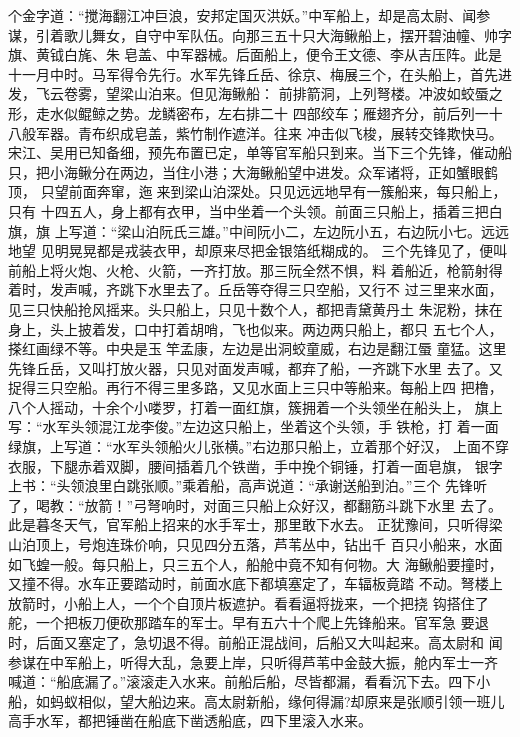 个金字道：“搅海翻江冲巨浪，安邦定国灭洪妖。”中军船上，却是高太尉、闻参
谋，引着歌儿舞女，自守中军队伍。向那三五十只大海鳅船上，摆开碧油幢、帅字
旗、黄钺白旄、朱皂盖、中军器械。后面船上，便令王文德、李从吉压阵。此是
十一月中时。马军得令先行。水军先锋丘岳、徐京、梅展三个，在头船上，首先进
发，飞云卷雾，望梁山泊来。但见海鳅船：
前排箭洞，上列弩楼。冲波如蛟蜃之形，走水似鲲鲸之势。龙鳞密布，左右排二十
四部绞车；雁翅齐分，前后列一十八般军器。青布织成皂盖，紫竹制作遮洋。往来
冲击似飞梭，展转交锋欺快马。
宋江、吴用已知备细，预先布置已定，单等官军船只到来。当下三个先锋，催动船
只，把小海鳅分在两边，当住小港；大海鳅船望中进发。众军诸将，正如蟹眼鹤顶，
只望前面奔窜，迤来到梁山泊深处。只见远远地早有一簇船来，每只船上，只有
十四五人，身上都有衣甲，当中坐着一个头领。前面三只船上，插着三把白旗，旗
上写道：“梁山泊阮氏三雄。”中间阮小二，左边阮小五，右边阮小七。远远地望
见明晃晃都是戎装衣甲，却原来尽把金银箔纸糊成的。
三个先锋见了，便叫前船上将火炮、火枪、火箭，一齐打放。那三阮全然不惧，料
着船近，枪箭射得着时，发声喊，齐跳下水里去了。丘岳等夺得三只空船，又行不
过三里来水面，见三只快船抢风摇来。头只船上，只见十数个人，都把青黛黄丹土
朱泥粉，抹在身上，头上披着发，口中打着胡哨，飞也似来。两边两只船上，都只
五七个人，搽红画绿不等。中央是玉竿孟康，左边是出洞蛟童威，右边是翻江蜃
童猛。这里先锋丘岳，又叫打放火器，只见对面发声喊，都弃了船，一齐跳下水里
去了。又捉得三只空船。再行不得三里多路，又见水面上三只中等船来。每船上四
把橹，八个人摇动，十余个小喽罗，打着一面红旗，簇拥着一个头领坐在船头上，
旗上写：“水军头领混江龙李俊。”左边这只船上，坐着这个头领，手铁枪，打
着一面绿旗，上写道：“水军头领船火儿张横。”右边那只船上，立着那个好汉，
上面不穿衣服，下腿赤着双脚，腰间插着几个铁凿，手中挽个铜锤，打着一面皂旗，
银字上书：“头领浪里白跳张顺。”乘着船，高声说道：“承谢送船到泊。”三个
先锋听了，喝教：“放箭！”弓弩响时，对面三只船上众好汉，都翻筋斗跳下水里
去了。此是暮冬天气，官军船上招来的水手军士，那里敢下水去。
正犹豫间，只听得梁山泊顶上，号炮连珠价响，只见四分五落，芦苇丛中，钻出千
百只小船来，水面如飞蝗一般。每只船上，只三五个人，船舱中竟不知有何物。大
海鳅船要撞时，又撞不得。水车正要踏动时，前面水底下都填塞定了，车辐板竟踏
不动。弩楼上放箭时，小船上人，一个个自顶片板遮护。看看逼将拢来，一个把挠
钩搭住了舵，一个把板刀便砍那踏车的军士。早有五六十个爬上先锋船来。官军急
要退时，后面又塞定了，急切退不得。前船正混战间，后船又大叫起来。高太尉和
闻参谋在中军船上，听得大乱，急要上岸，只听得芦苇中金鼓大振，舱内军士一齐
喊道：“船底漏了。”滚滚走入水来。前船后船，尽皆都漏，看看沉下去。四下小
船，如蚂蚁相似，望大船边来。高太尉新船，缘何得漏?却原来是张顺引领一班儿
高手水军，都把锤凿在船底下凿透船底，四下里滚入水来。
